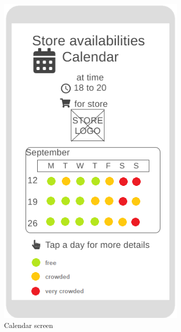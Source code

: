 \begin{figure}[h!]
\begin{subfigure}[b]{0.3\textwidth}
		\includegraphics[width=\linewidth]{../Diagrams/WireframesCLup/Calendar.png}
		\caption{Calendar screen}
		\label{fig:WfCalendar}
	\end{subfigure}
	\hfill
	\begin{subfigure}[b]{0.3\textwidth}

\end{subfigure}
\end{figure}
